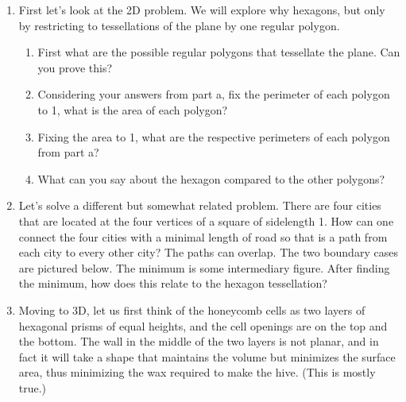 \documentclass{amsbook}
\begin{document}
\begin{enumerate}
	\item First let's look at the 2D problem. We will explore why hexagons, but only by restricting to tessellations of the plane by one regular polygon.
		\begin{enumerate}
			\item First what are the possible regular polygons that tessellate the plane. Can you prove this?
			\item Considering your answers from part a, fix the perimeter of each polygon to 1, what is the area of each polygon?
			\item Fixing the area to 1, what are the respective perimeters of each polygon from part a?
			\item What can you say about the hexagon compared to the other polygons?
		\end{enumerate}
	\item Let's solve a different but somewhat related problem. There are four cities that are located at the four vertices of a square of sidelength 1. How can one connect the four cities with a minimal length of road so that is a path from each city to every other city? The paths can overlap. The two boundary cases are pictured below. The minimum is some intermediary figure. After finding the minimum, how does this relate to the hexagon tessellation?\\
	\hspace{2cm}
	\item Moving to 3D, let us first think of the honeycomb cells as two layers of hexagonal prisms of equal heights, and the cell openings are on the top and the bottom. The wall in the middle of the two layers is not planar, and in fact it will take a shape that maintains the volume but minimizes the surface area, thus minimizing the wax required to make the hive. (This is mostly true.)\\

\end{enumerate}
\end{document}
